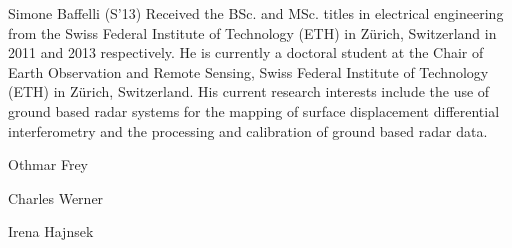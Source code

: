 \begin{IEEEbiography}{Simone Baffelli}
(S'13)
Received the BSc. and MSc. titles in electrical engineering from the Swiss Federal Institute of Technology (ETH) in Z\"{u}rich, Switzerland in 2011 and 2013 respectively. He is currently a doctoral student at the Chair of Earth Observation
and Remote Sensing, Swiss Federal Institute of Technology (ETH) in Z\"{u}rich, Switzerland. His current research interests include the use of ground based radar systems for the mapping of surface displacement differential interferometry and the processing and calibration of ground based radar data.
\end{IEEEbiography}
\begin{IEEEbiography}{Othmar Frey}
\end{IEEEbiography}
\begin{IEEEbiography}{Charles Werner}
\end{IEEEbiography}
\begin{IEEEbiography}{Irena Hajnsek }
\end{IEEEbiography}
